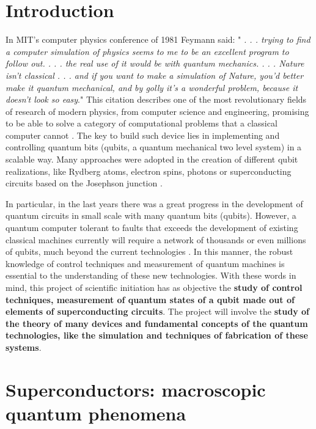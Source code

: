 \documentclass[12pt]{article}
\numberwithin{equation}{subsection}
\begin{document}


\section{Introduction}
In MIT's computer physics conference of 1981 Feymann said:\cite{Feynman1982SimulatingComputers} "\textit{ . . . trying to find a computer simulation of physics seems to me to be an excellent program to follow out. . . . the real use of it would be with quantum mechanics. . . . Nature isn’t classical . . . and if you want to make a simulation of Nature, you’d better make it quantum mechanical, and by golly it’s a wonderful problem, because it doesn’t look so easy}."
 This citation describes one of the most revolutionary fields of research of modern physics, from computer science and engineering, promising to be able to solve a category of computational problems that a classical computer cannot \cite{Nielsen2010QuantumInformation}. 
The key to build such device lies in implementing and controlling quantum bits (qubits, a quantum mechanical two level system) in a scalable way. Many approaches were adopted in the creation of different qubit realizations, like Rydberg atoms, electron spins, photons or superconducting circuits based on the Josephson junction \cite{Clarke2008SuperconductingBits}. 

In particular, in the last years there was a great progress in the development of quantum circuits in small scale with many quantum bits (qubits)\cite{Arute2019QuantumProcessor}. However, a quantum computer tolerant to faults that exceeds the development of existing classical machines currently will require a network of thousands or even millions of qubits, much beyond the current technologies \cite{Huang2020SuperconductingReview}. In this manner, the robust knowledge of control techniques and measurement of quantum machines is essential to the understanding of these new technologies.
With these words in mind, this project of scientific initiation has as objective the \textbf{ study of control techniques, measurement of quantum states of a qubit made out of elements of superconducting circuits}. The project will involve the \textbf{ study of the theory of many devices and fundamental concepts of the quantum technologies, like the simulation and techniques of fabrication of these systems}.
\section{Superconductors: macroscopic quantum phenomena\cite{gross2016applied} }
\end{document}
